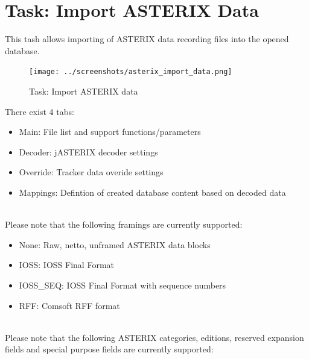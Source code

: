 \section{Task: Import ASTERIX Data}
\label{sec:task_import_asterix}

This tash allows importing of ASTERIX data recording files into the opened database. \\

\begin{figure}[H]
  \hspace*{-2.5cm}
    \texttt{[image: ../screenshots/asterix\_import\_data.png]}
  \caption{Task: Import ASTERIX data}
\end{figure}

There exist 4 tabs:

\begin{itemize}  
\item Main: File list and support functions/parameters
\item Decoder: jASTERIX decoder settings
\item Override: Tracker data overide settings
\item Mappings: Defintion of created database content based on decoded data
\end{itemize}
\ \\

Please note that the following framings are currently supported:
\begin{itemize}  
\item None: Raw, netto, unframed ASTERIX data blocks
\item IOSS: IOSS Final Format
\item IOSS\_SEQ: IOSS Final Format with sequence numbers
\item RFF: Comsoft RFF format
\end{itemize}
\ \\

Please note that the following ASTERIX categories, editions, reserved expansion fields and special purpose fields are currently supported: \\

